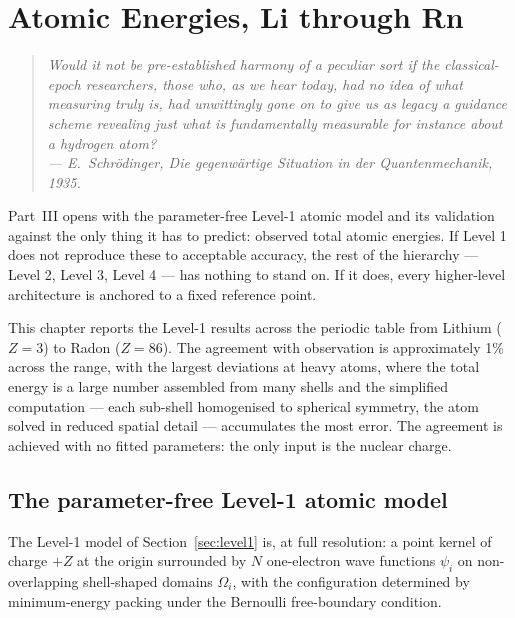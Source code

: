 \chapter{Atomic Energies, Li through Rn}\label{ch:atoms}


\begin{quote}
\itshape Would it not be pre-established harmony of a peculiar sort if the classical-epoch researchers, those who, as we hear today, had no idea of what measuring truly is, had unwittingly gone on to give us as legacy a guidance scheme revealing just what is fundamentally measurable for instance about a hydrogen atom?\\
\normalfont\hfill --- E.~Schr\"odinger, \emph{Die gegenw\"artige Situation in der Quantenmechanik}, 1935.
\end{quote}
\bigskip

Part~III opens with the parameter-free Level-1 atomic model and its validation against the only thing it has to predict: observed total atomic energies. If Level 1 does not reproduce these to acceptable accuracy, the rest of the hierarchy --- Level 2, Level 3, Level 4 --- has nothing to stand on. If it does, every higher-level architecture is anchored to a fixed reference point.

This chapter reports the Level-1 results across the periodic table from Lithium ($Z = 3$) to Radon ($Z = 86$). The agreement with observation is approximately 1\% across the range, with the largest deviations at heavy atoms, where the total energy is a large number assembled from many shells and the simplified computation --- each sub-shell homogenised to spherical symmetry, the atom solved in reduced spatial detail --- accumulates the most error. The agreement is achieved with no fitted parameters: the only input is the nuclear charge.

\section{The parameter-free Level-1 atomic model}\label{sec:level1-model}

The Level-1 model of Section~\ref{sec:level1} is, at full resolution: a point kernel of charge $+Z$ at the origin surrounded by $N$ one-electron wave functions $\psi_i$ on non-overlapping shell-shaped domains $\Omega_i$, with the configuration determined by minimum-energy packing under the Bernoulli free-boundary condition.

